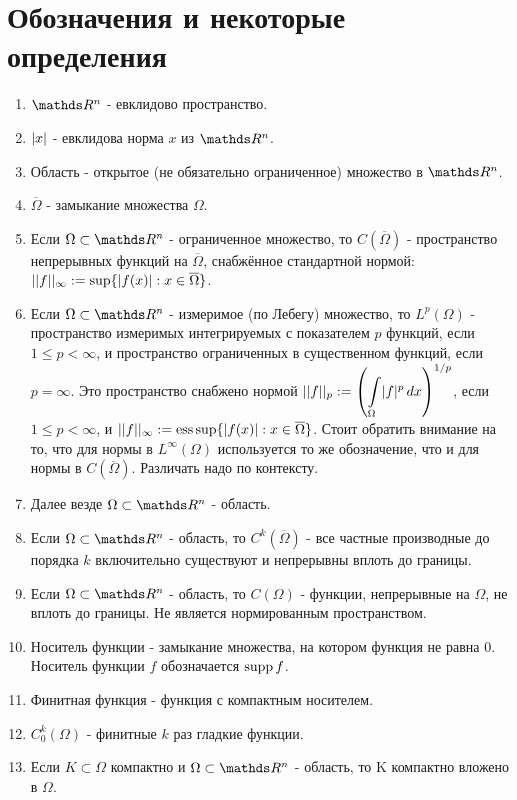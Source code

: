 \section*{Обозначения и некоторые определения}
\begin{enumerate}
\item $\real^n$ - евклидово пространство.
\item $\lvert x\rvert$ - евклидова норма $x$ из $\real^n$.
\item Область - открытое (не обязательно ограниченное) множество в $\real^n$.
\item $\overline{\Omega}$ - замыкание множества $\Omega$.
\item Если $\Omega \subset \real^n$ - ограниченное множество, то $C(\overline{\Omega})$ - пространство непрерывных функций на $\overline{\Omega}$, снабжённое стандартной нормой: $||f||_{\infty} := \sup \{ \lvert f(x)\rvert : x \in \overline{\Omega} \}$.
\item Если $\Omega \subset \real^n$ - измеримое (по Лебегу) множество, то $L^p (\Omega)$ - пространство измеримых интегрируемых с показателем $p$ функций, если $1 \leq p < \infty$, и пространство ограниченных в существенном функций, если $p = \infty$. Это пространство снабжено нормой $||f||_p := \left( \displaystyle \int \limits_{\Omega} \lvert f\rvert^p \,dx \right)^{1/p}$, если $1 \leq p < \infty$, и $||f||_{\infty} := \operatorname{ess\,sup} \{ \lvert f(x)\rvert : x \in \overline{\Omega} \}$. Стоит обратить внимание на то, что для нормы в $L^{\infty}(\Omega)$ используется то же обозначение, что и для нормы в $C(\overline{\Omega})$. Различать надо по контексту.
\item Далее везде $\Omega \subset \real^n$ - область. 
\item Если $\Omega \subset \real^n$ - область, то $C^k(\overline{\Omega})$ - все частные производные до порядка $k$ включительно существуют и непрерывны вплоть до границы.
\item Если $\Omega \subset \real^n$ - область, то $C(\Omega)$ - функции, непрерывные на $\Omega$, не вплоть до границы. Не является нормированным пространством.
\item Носитель функции - замыкание множества, на котором функция не равна $0$. Носитель функции $f$ обозначается $\operatorname{supp} f$.
\item Финитная функция - функция с компактным носителем.
\item $C^k_0(\Omega)$ - финитные $k$ раз гладкие  функции.
\item Если $K \subset \Omega$ компактно и $\Omega \subset \real^n$ - область, то K компактно вложено в $\Omega$.

\end{enumerate}
